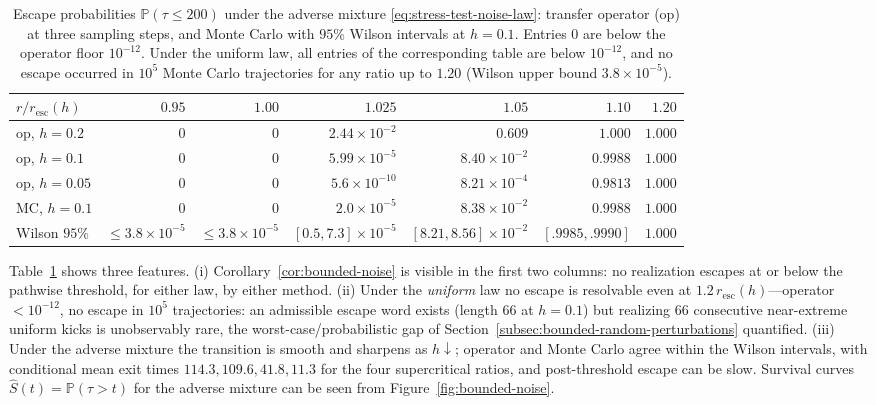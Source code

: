 \documentclass[pdflatex,sn-mathphys-num]{sn-jnl}
\numberwithin{equation}{section}
\theoremstyle{thmstyleone}%
\theoremstyle{definition}
\theoremstyle{remark}
\begin{document}
\begin{table}[t]
    \centering
    \caption{Escape probabilities \(\mathbb P(\tau\leq200)\) under the adverse mixture \eqref{eq:stress-test-noise-law}: transfer operator (op) at three sampling steps, and Monte Carlo with \(95\%\) Wilson intervals at \(h=0.1\).  Entries \(0\) are below the operator floor \(10^{-12}\). Under the uniform law, all entries of the corresponding table are below \(10^{-12}\), and no escape occurred in \(10^5\) Monte Carlo trajectories for any ratio up to \(1.20\) (Wilson upper bound \(3.8\times10^{-5}\)).}
    \label{tab:bounded-noise-probabilities}
    \small
    \begin{tabular}{l|rrrrrr}
        \toprule
        \(r/r_{\mathrm{esc}}(h)\)
        & \(0.95\) & \(1.00\) & \(1.025\) & \(1.05\) & \(1.10\)
        & \(1.20\)\\
        \midrule
        op, \(h=0.2\)  & \(0\) & \(0\) & \(2.44\times10^{-2}\)
            & \(0.609\) & \(1.000\) & \(1.000\)\\
        op, \(h=0.1\)  & \(0\) & \(0\) & \(5.99\times10^{-5}\)
            & \(8.40\times10^{-2}\) & \(0.9988\) & \(1.000\)\\
        op, \(h=0.05\) & \(0\) & \(0\) & \(5.6\times10^{-10}\)
            & \(8.21\times10^{-4}\) & \(0.9813\) & \(1.000\)\\
        \midrule
        MC, \(h=0.1\)  & \(0\) & \(0\) & \(2.0\times10^{-5}\)
            & \(8.38\times10^{-2}\) & \(0.9988\) & \(1.000\)\\
        Wilson \(95\%\) & \(\leq3.8\!\times\!10^{-5}\)
            & \(\leq3.8\!\times\!10^{-5}\)
            & \([0.5,7.3]\!\times\!10^{-5}\)
            & \([8.21,8.56]\!\times\!10^{-2}\)
            & \([.9985,.9990]\) & \(1.000\)\\
        \bottomrule
    \end{tabular}
\end{table}

Table~\ref{tab:bounded-noise-probabilities} shows three features. (i) Corollary~\ref{cor:bounded-noise} is visible in the first two columns: no realization escapes at or below the pathwise threshold, for either law,
by either method. (ii) Under the \emph{uniform} law no escape is resolvable even at $1.2\,r_{\mathrm{esc}}(h)$---operator $<10^{-12}$, no escape in $10^5$ trajectories: an admissible escape word exists (length $66$ at $h=0.1$) but realizing $66$ consecutive near-extreme uniform kicks is unobservably rare, the worst-case/probabilistic gap of Section~\ref{subsec:bounded-random-perturbations} quantified. (iii) Under
the adverse mixture the transition is smooth and sharpens as $h\downarrow$; operator and Monte Carlo agree within the Wilson intervals, with conditional mean exit times $114.3,109.6,41.8,11.3$ for the four supercritical ratios, and post-threshold escape can be slow. Survival curves $\widehat S(t)=\mathbb P(\tau>t)$ for the adverse mixture can be seen from Figure~\ref{fig:bounded-noise}.
\end{document}
